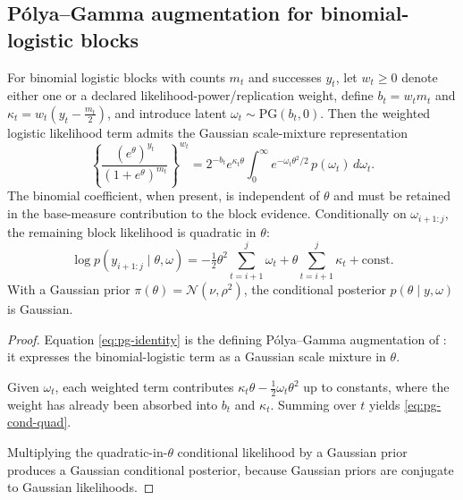 \subsection{Pólya--Gamma augmentation for binomial-logistic blocks}
\begin{theorem}
\label{thm:pg}
For binomial logistic blocks with counts $m_t$ and successes $y_t$, let $w_t\ge 0$ denote either
one or a declared likelihood-power/replication weight, define
$b_t=w_t m_t$ and $\kappa_t=w_t(y_t-\tfrac{m_t}{2})$, and introduce latent
$\omega_t\sim\mathrm{PG}(b_t,0)$. Then the weighted logistic likelihood term admits the Gaussian
scale-mixture representation
\begin{equation}
\left\{\frac{(e^\theta)^{y_t}}{(1+e^\theta)^{m_t}}\right\}^{w_t}
 = 2^{-b_t} e^{\kappa_t\theta}
   \int_0^\infty e^{-\omega_t\theta^2/2}\,p(\omega_t)\,d\omega_t.
\label{eq:pg-identity}
\end{equation}
The binomial coefficient, when present, is independent of $\theta$ and must be retained in the base-measure contribution to the block evidence. Conditionally on $\omega_{i+1:j}$, the remaining block likelihood is quadratic in $\theta$:
\begin{equation}
\log p(y_{i+1:j}\mid \theta,\omega)
 =
 -\tfrac{1}{2}\theta^2 \sum_{t=i+1}^j \omega_t
 + \theta \sum_{t=i+1}^j \kappa_t
 + \mathrm{const}.
\label{eq:pg-cond-quad}
\end{equation}
With a Gaussian prior $\pi(\theta)=\mathcal{N}(\nu,\rho^2)$, the conditional posterior
$p(\theta\mid y,\omega)$ is Gaussian.
\end{theorem}

\begin{proof}
Equation \eqref{eq:pg-identity} is the defining P\'olya--Gamma augmentation of
\citet{polson2013pg}: it expresses the binomial-logistic term as a Gaussian scale mixture in
$\theta$.

Given $\omega_t$, each weighted term contributes $\kappa_t\theta-\tfrac12\omega_t\theta^2$ up to
constants, where the weight has already been absorbed into $b_t$ and $\kappa_t$. Summing over $t$
yields \eqref{eq:pg-cond-quad}.

Multiplying the quadratic-in-$\theta$ conditional likelihood by a Gaussian prior produces a
Gaussian conditional posterior, because Gaussian priors are conjugate to Gaussian likelihoods.
\end{proof}

